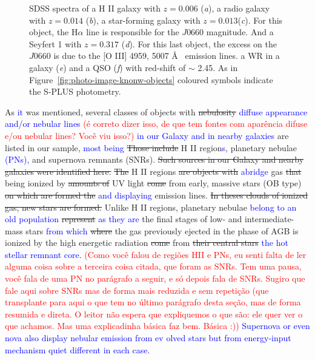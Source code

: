 \documentclass[fleqn,usenatbib]{mnras}
\newcommand{\rlopes}[1]{\textcolor{blue}{#1}}
\newcommand{\comment}[1]{\textcolor{red}{#1}}
\begin{document}
\begin{figure}
\begin{tabular}{ll}
  \end{tabular}
  \caption{SDSS spectra of a H II galaxy with $z = 0.006$ (\textit{a}), a radio galaxy with $z = 0.014$ (\textit{b}), 
  a star-forming galaxy with $z = 0.013$(\textit{c}). For this object, the H{$\alpha$} line 
  is responsible for the $J0660$ magnitude. And a Seyfert 1 with $z = 0.317$ (\textit{d}). 
  For this last object, the excess on the $J0660$ is due to the [O III] 4959, 5007 \AA~ emission lines. 
  a WR in a galaxy (\textit{e}) 
          and a QSO (\textit{f}) with red-shift of $\sim$ 2.45.  As in Figure~\ref{fig:photo-image-knonw-objects} coloured 
          symbols indicate the S-PLUS photometry.}
  \label{fig:photo-image-knonw-objects2}
\end{figure}

As \rlopes{it} was mentioned, several classes of objects with \sout{nebulosity} \rlopes{diffuse appearance and/or nebular lines}
\comment{(é correto dizer isso, de que tem fontes com aparência difuse e/ou nebular lines? Você viu isso?)}
\rlopes{in our Galaxy and in nearby galaxies} are listed in our sample, 
\rlopes{most being} \sout{Those include} H II region\rlopes{s}, planetary nebulae \rlopes{(PNs),} and supernova
remnants (SNRs). 
\sout{Such sources in our Galaxy and nearby galaxies were identified here.} 
\sout{The} H II regions \sout{are objects with} \rlopes{abridge} gas \sout{that} being ionized by 
\sout{amounts of} 
UV light 
\sout{come} 
from early, massive stars (OB type) \sout{on which are formed the} \rlopes{and displaying} emission lines. 
\sout{In theses clouds of ionized gas,
new stars are formed.} 
Unlike H II regions, planetary nebulae
\rlopes{belong to an old population} \sout{represent} \rlopes{as they are} the final stages of low- and intermediate-mass stars
\rlopes{from which} 
\sout{where} 
the gas previously ejected in the phase of AGB is ionized by the high energetic radiation \sout{come} 
from 
\sout{their central stars} 
\rlopes{the hot stellar remnant core}. \comment{(Como você falou de regiões HII e PNs, eu senti falta de ler alguma coisa sobre a terceira coisa citada, que foram as SNRs. Tem uma pausa, você fala de uma PN no parágrafo a seguir, e só depois fala de SNRs. Sugiro que fale aqui sobre SNRs mas de forma mais reduzida e sem repetição (que transplante para aqui o que tem no último parágrafo desta seção, mas de forma resumida e direta. O leitor não espera que expliquemos o que são: ele quer ver o que achamos. Mas uma explicadinha básica faz bem. Básica :))}
\rlopes{Supernova or even nova also display nebular emission from ev olved stars but from energy-input mechanism quiet different in each case.}
\end{document}

